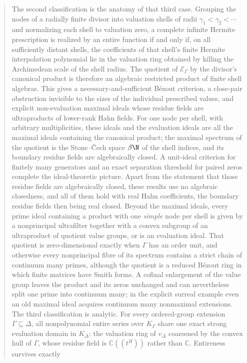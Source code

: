 \documentclass[11pt]{article}
\theoremstyle{plain}
\theoremstyle{plain}
\theoremstyle{plain}
\theoremstyle{definition}
\theoremstyle{definition}
\theoremstyle{definition}
\theoremstyle{definition}
\theoremstyle{remark}
\newcommand{\C}{\mathbb C}\newcommand{\R}{\mathbb R}
\newcommand{\K}{K_\Gamma}\newcommand{\KD}{K_\Delta}
\newcommand{\E}{\mathcal E_\Gamma}
\begin{document}
\begin{abstract}
The second classification is the anatomy of that third case. Grouping the
nodes of a radially finite divisor into valuation shells of radii
$\gamma_1<\gamma_2<\cdots$ and normalizing each shell to valuation zero, a
complete infinite Hermite prescription is realized by an entire function if
and only if, on all sufficiently distant shells, the coefficients of that
shell's finite Hermite interpolation polynomial lie in the valuation ring
obtained by killing the Archimedean scale of the shell radius. The quotient
of $\E$ by the divisor's canonical product is therefore an algebraic
restricted product of finite shell algebras. This gives a
necessary-and-sufficient B\'ezout criterion, a close-pair obstruction
invisible to the sizes of the individual prescribed values, and explicit
non-evaluation maximal ideals whose residue fields are ultraproducts of
lower-rank Hahn fields. For one node per shell, with arbitrary
multiplicities, these ideals and the evaluation ideals are all the maximal
ideals containing the canonical product; the maximal spectrum of the
quotient is the Stone--\v{C}ech space $\beta\N$ of the shell indices, and
its boundary residue fields are algebraically closed. A unit-ideal
criterion for finitely many generators and an exact separation threshold
for paired zeros complete the ideal-theoretic picture. Apart from the
statement that those residue fields are algebraically closed, these results
use no algebraic closedness, and all of them hold with real Hahn
coefficients, the boundary residue fields then being real closed. Beyond the
maximal ideals, every prime ideal containing a product with one \emph{simple}
node per shell is given by a nonprincipal ultrafilter together with a convex
subgroup of an ultraproduct of quotient value groups, or is an evaluation
ideal. That quotient is zero-dimensional exactly when $\Gamma$ has an order
unit, and otherwise every nonprincipal fibre of its spectrum contains a
strict chain of continuum many primes, although the quotient is a reduced
B\'ezout ring in which finite matrices have Smith forms. A cofinal
enlargement of the value group leaves the product and its zeros unchanged
and can nevertheless split one prime into continuum many; in the explicit
surreal example even an old maximal ideal acquires continuum many nonmaximal
extensions. The third
classification is analytic. For every
ordered-group extension $\Gamma\subseteq\Delta$, all nonpolynomial entire
series over $\K$ share one exact strong evaluation domain in $\KD$: the
valuation ring of $v_\Delta$ coarsened by the convex hull of $\Gamma$, whose
residue field is $\C((t^H))$ rather than $\C$. Entireness survives exactly

\end{abstract}
\end{document}
